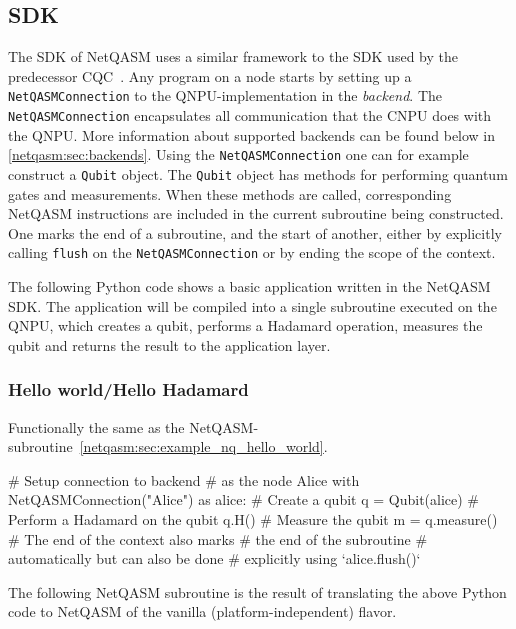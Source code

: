 \subsection{SDK}
\label{netqasm:sec:sdk}
The SDK of \ac{NetQASM} uses a similar framework to the SDK used by the predecessor \ac{CQC}~\cite{git_cqc}.
Any program on a node starts by setting up a \texttt{NetQASMConnection} to the \ac{QNPU}-implementation in the \emph{backend}.
The \texttt{NetQASMConnection} encapsulates all communication that the \ac{CNPU} does with the \ac{QNPU}.
More information about supported backends can be found below in \cref{netqasm:sec:backends}.
Using the \texttt{NetQASMConnection} one can for example construct a \texttt{Qubit} object.
The \texttt{Qubit} object has methods for performing quantum gates and measurements.
When these methods are called, corresponding \ac{NetQASM} instructions are included in the current subroutine being constructed.
One marks the end of a subroutine, and the start of another, either by explicitly calling \texttt{flush} on the \texttt{NetQASMConnection} or by ending the scope of the  context.

The following Python code shows a basic application written in the \ac{NetQASM} SDK.
The application will be compiled into a single subroutine executed on the \ac{QNPU}, which creates a qubit, performs a Hadamard operation, measures the qubit and returns the result to the application layer.
\subsubsection{Hello world/Hello Hadamard}
Functionally the same as the \ac{NetQASM}-subroutine~\ref{netqasm:sec:example_nq_hello_world}.
\begin{pycode}
  # Setup connection to backend
  # as the node Alice
  with NetQASMConnection("Alice") as alice:
    # Create a qubit
    q = Qubit(alice)
    # Perform a Hadamard on the qubit
    q.H()
    # Measure the qubit
    m = q.measure()
    # The end of the context also marks
    # the end of the subroutine
    # automatically but can also be done
    # explicitly using `alice.flush()`
\end{pycode}

The following \ac{NetQASM} subroutine is the result of translating the above Python code to \ac{NetQASM} of the vanilla (platform-independent) flavor.

